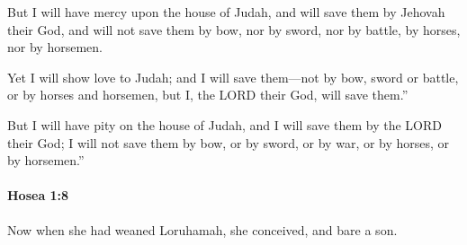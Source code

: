 			\begin{versebox}
					\item[BHS] 
					\item[LXX] 
					\item[ASV] But I will have mercy upon the house of Judah, and will save them by Jehovah their God, and will not save them by bow, nor by sword, nor by battle, by horses, nor by horsemen.
					\item[NIV] Yet I will show love to Judah; and I will save them—not by bow, sword or battle, or by horses and horsemen, but I, the LORD their God, will save them.”
					\item[NRSV] But I will have pity on the house of Judah, and I will save them by the LORD their God; I will not save them by bow, or by sword, or by war, or by horses, or by horsemen.”
			\end{versebox}

		\paragraph{Hosea 1:8} %
			\label{HOSEA-1-8}

			Now when she had weaned Loruhamah, she conceived, and bare a son.

